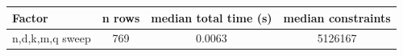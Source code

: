 \begin{tabular}{lccc}
\toprule
Factor & n rows & median total time (s) & median constraints \\
\midrule
n,d,k,m,q sweep & 769 & 0.0063 & 5126167 \\
\bottomrule
\end{tabular}
